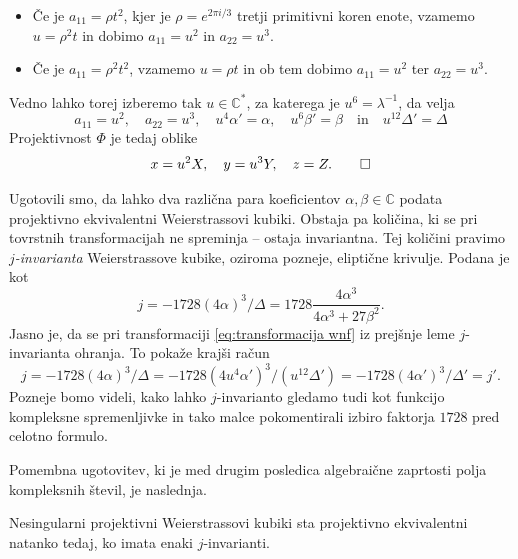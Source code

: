 \documentclass[mat1]{fmfdelo}
\numberwithin{equation}{section}
\newcommand{\C}{\mathbb C}
\newcommand{\CM}{\mathbb C ^*}
\newcommand{\inv}{^{-1}}
\theoremstyle{definition}
\begin{document}
\begin{dokaz}
\begin{itemize}
        \item Če je $a_{11} = \rho t^2$, kjer je $\rho = e^{2\pi i/3}$ tretji primitivni koren enote, vzamemo $u = \rho^2 t$ in dobimo $a_{11} = u^2$ in $a_{22} = u^3$.
        \item Če je $a_{11} = \rho^2 t^2$, vzamemo $u = \rho t$ in ob tem dobimo $a_{11} = u^2$ ter $a_{22} = u^3$.
    \end{itemize}
    Vedno lahko torej izberemo tak $u \in \CM$, za katerega je $u^6 = \lambda\inv$, da velja
    \[
        a_{11} = u^2, \quad a_{22} = u^3, \quad u^4\alpha' = \alpha, \quad u^6 \beta' = \beta \quad \text{in} \quad u^{12} \Delta' = \Delta
    \]
    Projektivnost $\Phi$ je tedaj oblike
    \[
        x = u^2 X, \quad y = u^3 Y, \quad z = Z. \qedhere
    \]
\end{dokaz}

Ugotovili smo, da lahko dva različna para koeficientov $\alpha, \beta \in \C$ podata projektivno ekvivalentni Weierstrassovi kubiki. Obstaja pa količina, ki se pri tovrstnih transformacijah ne spreminja -- ostaja invariantna. Tej količini pravimo \emph{$j$-invarianta} Weierstrassove kubike, oziroma pozneje, eliptične krivulje. Podana je kot 
\[
    j = -1728(4\alpha)^3/\Delta = 1728\frac{4\alpha^3}{4\alpha^3 + 27\beta^2}.  
\] 
Jasno je, da se pri transformaciji \eqref{eq:transformacija wnf} iz prejšnje leme $j$-invarianta ohranja. To pokaže krajši račun
\[
    j = -1728(4\alpha)^3/\Delta = -1728(4u^4\alpha')^3/(u^{12}\Delta') = -1728(4\alpha')^3/\Delta' = j'.
\]
Pozneje bomo videli, kako lahko $j$-invarianto gledamo tudi kot funkcijo kompleksne spremenljivke in tako malce pokomentirali 
izbiro faktorja $1728$ pred celotno formulo.

Pomembna ugotovitev, ki je med drugim posledica algebraične zaprtosti polja kompleksnih števil, je naslednja. 

\begin{trditev}
    \label{proj ekviv iff j enaki}
    Nesingularni projektivni Weierstrassovi kubiki sta projektivno ekvivalentni natanko tedaj, ko imata enaki $j$-invarianti.
\end{trditev}
\end{document}

